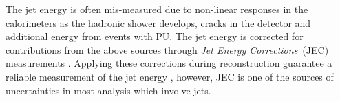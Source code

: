 \newline
The jet energy is often mis-measured due to non-linear responses in the calorimeters as the hadronic shower develops, cracks in the detector and additional energy from events with PU. The jet energy is corrected for contributions from the above sources through \textit{Jet Energy Corrections}~(JEC) measurements \cite{JEC}. Applying these corrections during reconstruction guarantee a reliable measurement of the jet energy , however, JEC is one of the sources of uncertainties in most analysis which involve jets. 



